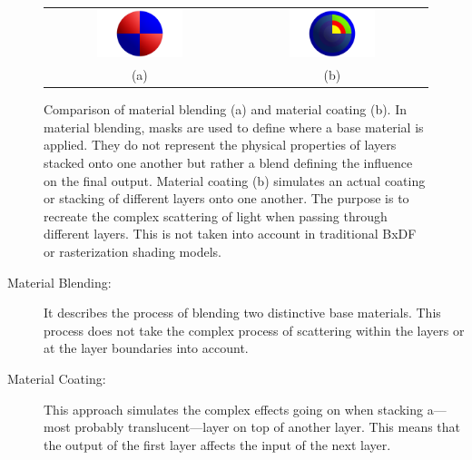 	\begin{figure}
		\centering\small 
		\begin{tabular}{@{}cc@{}}
			\includegraphics[width=0.475\textwidth]{images/03cha_01_masterGraphicLayering_Mat1+2.jpg} & \hfill
			\includegraphics[width=0.475\textwidth]{images/03cha_02_masterGraphicLayering_layering.jpg} \\	
			(a) & (b)
		\end{tabular}
		\caption{{Comparison of material blending (a) and material coating (b). In material blending, masks are used to define where a base material is applied. They do not represent the physical properties of layers stacked onto one another but rather a blend defining the influence on the final output. Material coating (b) simulates an actual coating or stacking of different layers onto one another. The purpose is to recreate the complex scattering of light when passing through different layers. This is not taken into account in traditional BxDF or rasterization shading models.}}
		\label{fig:CoatinBLending}
	\end{figure}

	\begin{description}
		\item[Material Blending:]  { It describes the process of blending two distinctive base materials. This process does not take the complex process of scattering within the layers or at the layer boundaries into account.}%
		\item[Material Coating:] { This approach simulates the complex effects going on when stacking a---most probably translucent---layer on top of another layer. This means that the output of the first layer affects the input of the next layer. }%
	\end{description}

